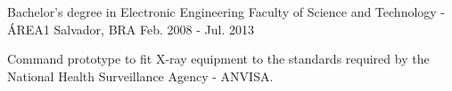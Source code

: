 \begin{cventries}
  \cventry
    {Bachelor's degree in Electronic Engineering} %
    {Faculty of Science and Technology - ÁREA1} %
    {Salvador, BRA} %
    {Feb. 2008 - Jul. 2013} %
    {
      \begin{cvitems} %
        \item {Command prototype to fit X-ray equipment to the standards required by the National Health Surveillance Agency - ANVISA.}
      \end{cvitems}
    }

\end{cventries}
